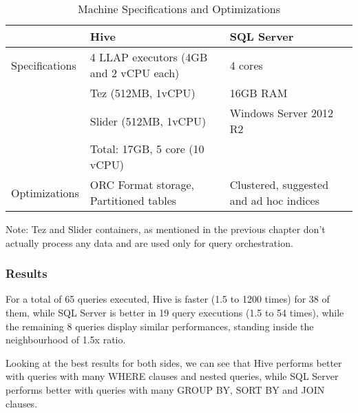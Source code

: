 \begin{table}[!htb]
    \caption{Machine Specifications and Optimizations}
\begin{center}
    \begin{tabular}{|l|p{6cm}|p{5cm}|}
        \hline
        & Hive & SQL Server \\ \hline
        Specifications & 4 LLAP executors (4GB and 2 vCPU each) & 4 cores\\
        & Tez (512MB, 1vCPU) & 16GB RAM\\
        & Slider (512MB, 1vCPU) & Windows Server 2012 R2 \\
        & Total: 17GB, 5 core (10 vCPU) & \\ \hline    
        Optimizations & ORC Format storage, Partitioned tables & Clustered, suggested and ad hoc indices\\ \hline      
    \end{tabular}
\end{center}
\end{table}


Note: Tez and Slider containers, as mentioned in the previous chapter don't actually process any data and are used only for query orchestration.

\subsubsection{Results}

For a total of 65 queries executed, Hive is faster (1.5 to 1200 times) for 38 of them, while SQL Server is better in 19 query executions (1.5 to 54 times), while the remaining 8 queries display similar performances, standing inside the neighbourhood of 1.5x ratio.

Looking at the best results for both sides, we can see that Hive performs better with queries with many WHERE clauses and nested queries, while SQL Server performs better with queries with many GROUP BY, SORT BY and JOIN clauses.

